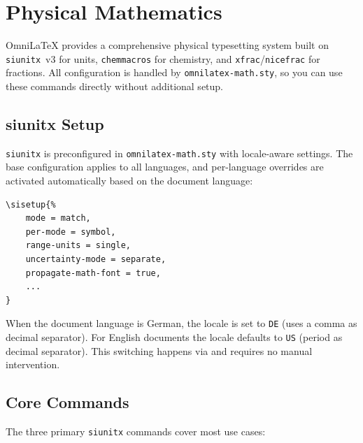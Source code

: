 \chapter{Physical Mathematics}
\label{ch:physical-math}

OmniLaTeX provides a comprehensive physical typesetting system built on
\texttt{siunitx}~v3 for units, \texttt{chemmacros} for chemistry, and
\texttt{xfrac}/\texttt{nicefrac} for fractions.  All configuration is
handled by \texttt{omnilatex-math.sty}, so you can use these commands
directly without additional setup.

\section{siunitx Setup}

\texttt{siunitx} is preconfigured in \texttt{omnilatex-math.sty} with
locale-aware settings.  The base configuration applies to all languages,
and per-language overrides are activated automatically based on the
document language:

\begin{verbatim}
\sisetup{%
    mode = match,
    per-mode = symbol,
    range-units = single,
    uncertainty-mode = separate,
    propagate-math-font = true,
    ...
}
\end{verbatim}

When the document language is German, the locale is set to \texttt{DE}
(uses a comma as decimal separator).  For English documents the locale
defaults to \texttt{US} (period as decimal separator).  This switching
happens via  and requires no manual intervention.

\section{Core Commands}

The three primary \texttt{siunitx} commands cover most use cases:

